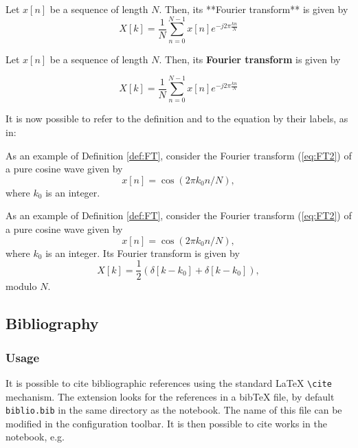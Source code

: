 \begin{listing}
\begin{definition} \label{def:FT}
Let $x[n]$ be a sequence of length $N$. Then, its **Fourier transform** is given by
\begin{equation}
\label{eq:FT}
X[k]= \frac{1}{N} \sum_{n=0}^{N-1} x[n] e^{-j2\pi \frac{kn}{N}}
\end{equation}
\end{definition}
\end{listing}

    \begin{definition} \label{def:FT}
Let \(x[n]\) be a sequence
of length \(N\). Then, its \textbf{Fourier transform} is given by


\begin{equation}
\label{eq:FT2}
X[k]= \frac{1}{N} \sum_{n=0}^{N-1} x[n] e^{-j2\pi \frac{kn}{N}}
\end{equation}


\end{definition}

    It is now possible to refer to the definition and to the equation by
their labels, as in:

\begin{listing}
As an example of Definition \ref{def:FT}, consider the Fourier transform (\ref{eq:FT2}) of a pure cosine wave given by
$$
x[n]= \cos(2\pi k_0 n/N),
$$
where $k_0$ is an integer. 
\end{listing}

    As an example of Definition \ref{def:FT}, consider the Fourier transform
(\ref{eq:FT2}) of a pure cosine wave given by \[
x[n]= \cos(2\pi k_0 n/N),
\] where \(k_0\) is an integer. Its Fourier transform is given by \[
X[k] = \frac{1}{2} \left( \delta[k-k_0] + \delta[k-k_0] \right), 
\] modulo \(N\).

    \subsection{Bibliography}\label{bibliography}

    \subsubsection{Usage}\label{usage}

    It is possible to cite bibliographic references using the standard LaTeX
\texttt{\textbackslash{}cite} mechanism. The extension looks for the
references in a bibTeX file, by default \texttt{biblio.bib} in the same
directory as the notebook. The name of this file can be modified in the
configuration toolbar. It is then possible to cite works in the
notebook, e.g.

